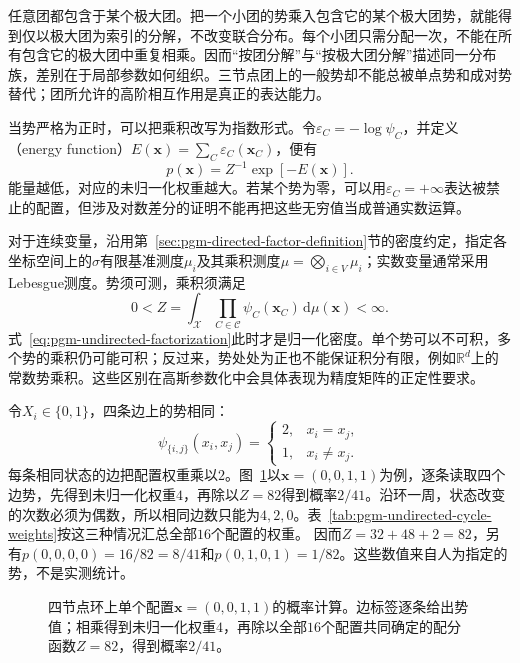 任意团都包含于某个极大团。把一个小团的势乘入包含它的某个极大团势，就能得到仅以极大团为索引的分解，不改变联合分布。每个小团只需分配一次，不能在所有包含它的极大团中重复相乘。因而“按团分解”与“按极大团分解”描述同一分布族，差别在于局部参数如何组织。三节点团上的一般势却不能总被单点势和成对势替代；团所允许的高阶相互作用是真正的表达能力。

当势严格为正时，可以把乘积改写为指数形式。令$\varepsilon_C=-\log\psi_C$，并定义（energy function）$E(\bm{x})=\sum_C\varepsilon_C(\bm{x}_C)$，便有
\[
  p(\bm{x})=Z^{-1}\exp[-E(\bm{x})].
\]
能量越低，对应的未归一化权重越大。若某个势为零，可以用$\varepsilon_C=+\infty$表达被禁止的配置，但涉及对数差分的证明不能再把这些无穷值当成普通实数运算。

对于连续变量，沿用第~\ref{sec:pgm-directed-factor-definition}节的密度约定，指定各坐标空间上的$\sigma$有限基准测度$\mu_i$及其乘积测度$\mu=\bigotimes_{i\in V}\mu_i$；实数变量通常采用Lebesgue测度。势须可测，乘积须满足
\begin{equation}
  0<Z=\int_{\mathcal{X}}\prod_{C\in\mathcal{C}}
       \psi_C(\bm{x}_C)\,\mathrm{d}\mu(\bm{x})<\infty.
  \label{eq:pgm-undirected-continuous-partition}
\end{equation}
式~\eqref{eq:pgm-undirected-factorization}此时才是归一化密度。单个势可以不可积，多个势的乘积仍可能可积；反过来，势处处为正也不能保证积分有限，例如$\mathbb{R}^d$上的常数势乘积。这些区别在高斯参数化中会具体表现为精度矩阵的正定性要求。

\begin{example}[四节点环上的相容分数]
  \label{ex:pgm-undirected-cycle}
  令$X_i\in\{0,1\}$，四条边上的势相同：
  \[
    \psi_{\{i,j\}}(x_i,x_j)=
    \begin{cases}
      2,&x_i=x_j,\\
      1,&x_i\neq x_j.
    \end{cases}
  \]
  每条相同状态的边把配置权重乘以$2$。图~\ref{fig:pgm-undirected-factorization-example}以$\bm{x}=(0,0,1,1)$为例，逐条读取四个边势，先得到未归一化权重$4$，再除以$Z=82$得到概率$2/41$。沿环一周，状态改变的次数必须为偶数，所以相同边数只能为$4,2,0$。表~\ref{tab:pgm-undirected-cycle-weights}按这三种情况汇总全部$16$个配置的权重。
  因而$Z=32+48+2=82$，另有$p(0,0,0,0)=16/82=8/41$和$p(0,1,0,1)=1/82$。这些数值来自人为指定的势，不是实测统计。
\end{example}

\begin{figure}[htbp]
  \centering
  
  \caption{四节点环上单个配置$\bm{x}=(0,0,1,1)$的概率计算。边标签逐条给出势值；相乘得到未归一化权重$4$，再除以全部$16$个配置共同确定的配分函数$Z=82$，得到概率$2/41$。}
  \label{fig:pgm-undirected-factorization-example}
\end{figure}

